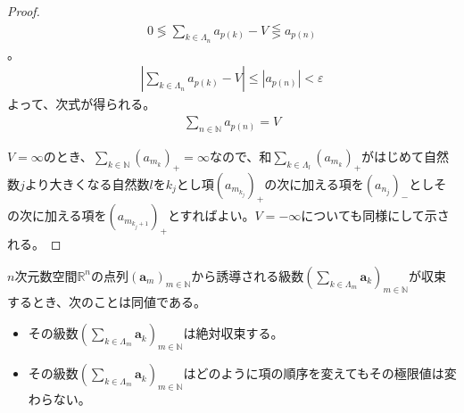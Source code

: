 \documentclass[dvipdfmx]{jsarticle}
\begin{document}
\begin{proof}
{\begin{align*}
0 \lessgtr \sum_{k \in \varLambda_{n}} a_{p(k)} - V \lesseqgtr a_{p(n)}
\end{align*}}。
\begin{align*}
\left| \sum_{k \in \varLambda_{n}} a_{p(k)} - V \right| \leq \left| a_{p(n)} \right| < \varepsilon
\end{align*}
よって、次式が得られる。
\begin{align*}
\sum_{n \in \mathbb{N}} a_{p(n)} = V
\end{align*}\par
$V = \infty$のとき、$\sum_{k \in \mathbb{N}} \left( a_{m_{k}} \right)_{+} = \infty$なので、和$\sum_{k \in \varLambda_{l}} \left( a_{m_{k}} \right)_{+}$がはじめて自然数$j$より大きくなる自然数$l$を$k_{j}$とし項$\left( a_{m_{k_{j}}} \right)_{+}$の次に加える項を$\left( a_{n_{j}} \right)_{-}$としその次に加える項を$\left( a_{m_{k_{j} + 1}} \right)_{+}$とすればよい。$V = - \infty$についても同様にして示される。
\end{proof}
\begin{thm}\label{4.1.8.24}
$n$次元数空間$\mathbb{R}^{n}$の点列$\left( \mathbf{a}_{m} \right)_{m \in \mathbb{N}}$から誘導される級数$\left( \sum_{k \in \varLambda_{m}} \mathbf{a}_{k} \right)_{m \in \mathbb{N}}$が収束するとき、次のことは同値である。
\begin{itemize}
\item
  その級数$\left( \sum_{k \in \varLambda_{m}} \mathbf{a}_{k} \right)_{m \in \mathbb{N}}$は絶対収束する。
\item
  その級数$\left( \sum_{k \in \varLambda_{m}} \mathbf{a}_{k} \right)_{m \in \mathbb{N}}$はどのように項の順序を変えてもその極限値は変わらない。
\end{itemize}
\end{thm}
\end{document}
